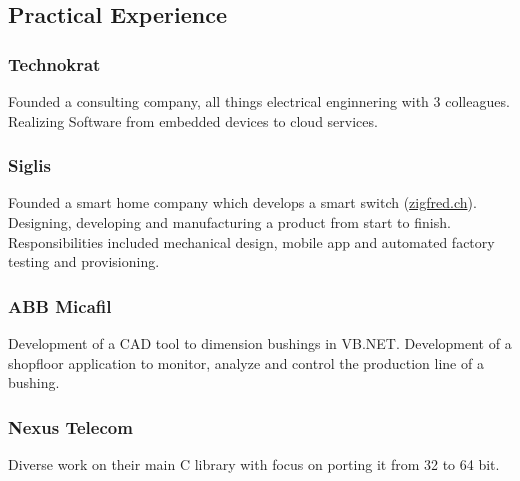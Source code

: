     \begin{timeline}
    
    
    \subsection{Practical Experience}
    
    \subsubsection{Technokrat}
    Founded a consulting company, all things electrical enginnering with 3 colleagues.
    Realizing Software from embedded devices to cloud services.
    \sectionsep

    \subsubsection{Siglis}
    Founded a smart home company which develops a smart switch (\href{https://zigfred.ch}{zigfred.ch}).
    Designing, developing and manufacturing a product from start to finish. Responsibilities included mechanical design, mobile app and automated factory testing and provisioning.
    \sectionsep

    \subsubsection{ABB Micafil}
    Development of a CAD tool to dimension bushings in VB.NET.
    Development of a shopfloor application to monitor, analyze and control the production line of a bushing.
    \sectionsep
    
    \subsubsection{Nexus Telecom}
    Diverse work on their main C library with focus on porting it from 32 to 64 bit.
    \sectionsep

    

\end{timeline}
